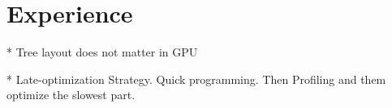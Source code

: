 \section{Experience}

* Tree layout does not matter in GPU

* Late-optimization Strategy. Quick programming. Then Profiling and them optimize the slowest part.  